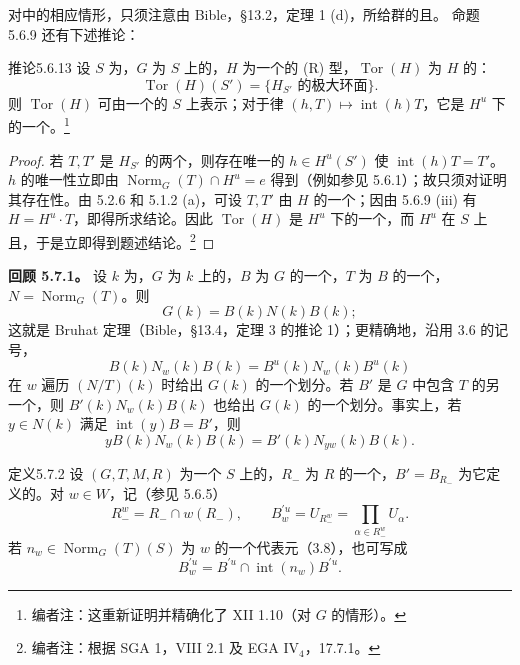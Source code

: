 对中的相应情形，只须注意由 Bible，\S 13.2，定理 1 (d)，所给群的且。
命题 5.6.9 还有下述推论：
\begin{SGAresult}{推论}{5.6.13}
设 $S$ 为，$G$ 为 $S$ 上的，$H$ 为一个的 (R) 型，$\operatorname{Tor}(H)$ 为 $H$ 的：
\[\operatorname{Tor}(H)(S')=\{H_{S'}\text{ 的极大环面}\}.\]
则 $\operatorname{Tor}(H)$ 可由一个的 $S$ 上表示；对于律 $(h,T)\mapsto\operatorname{int}(h)T$，它是 $H^u$ 下的一个。\footnote{编者注：这重新证明并精确化了 XII 1.10（对 $G$ 的情形）。}
\end{SGAresult}
\begin{proof}
若 $T,T'$ 是 $H_{S'}$ 的两个，则存在唯一的 $h\in H^u(S')$ 使 $\operatorname{int}(h)T=T'$。$h$ 的唯一性立即由 $\operatorname{Norm}_G(T)\cap H^u=e$ 得到（例如参见 5.6.1）；故只须对证明其存在性。由 5.2.6 和 5.1.2 (a)，可设 $T,T'$ 由 $H$ 的一个；因由 5.6.9 (iii) 有 $H=H^u\cdot T$，即得所求结论。因此 $\operatorname{Tor}(H)$ 是 $H^u$ 下的一个，而 $H^u$ 在 $S$ 上且，于是立即得到题述结论。\footnote{编者注：根据 SGA 1，VIII 2.1 及 EGA IV$_4$，17.7.1。}
\end{proof}
\textbf{回顾 5.7.1。} 设 $k$ 为，$G$ 为 $k$ 上的，$B$ 为 $G$ 的一个，$T$ 为 $B$ 的一个，$N=\operatorname{Norm}_G(T)$。则
\[G(k)=B(k)N(k)B(k);\]
这就是 Bruhat 定理（Bible，\S 13.4，定理 3 的推论 1）；更精确地，沿用 3.6 的记号，
\[B(k)N_w(k)B(k)=B^u(k)N_w(k)B^u(k)\]
在 $w$ 遍历 $(N/T)(k)$ 时给出 $G(k)$ 的一个划分。若 $B'$ 是 $G$ 中包含 $T$ 的另一个，则 $B'(k)N_w(k)B(k)$ 也给出 $G(k)$ 的一个划分。事实上，若 $y\in N(k)$ 满足 $\operatorname{int}(y)B=B'$，则
\[yB(k)N_w(k)B(k)=B'(k)N_{yw}(k)B(k).\]
\begin{SGAresult}{定义}{5.7.2}
设 $(G,T,M,R)$ 为一个 $S$ 上的，$R_-$ 为 $R$ 的一个，$B'=B_{R_-}$ 为它定义的。对 $w\in W$，记（参见 5.6.5）
\[R_-^w=R_-\cap w(R_-),\qquad B_w^{\prime u}=U_{R_-^w}=\prod_{\alpha\in R_-^w}U_\alpha.\]
若 $n_w\in\operatorname{Norm}_G(T)(S)$ 为 $w$ 的一个代表元（3.8），也可写成
\[B_w^{\prime u}=B^{\prime u}\cap\operatorname{int}(n_w)B^{\prime u}.\]
\end{SGAresult}

